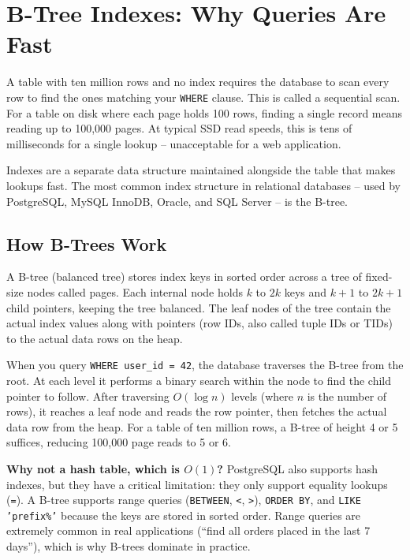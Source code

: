 \documentclass[11pt,a4paper]{article}
\begin{document}
\newpage

\section{B-Tree Indexes: Why Queries Are Fast}

A table with ten million rows and no index requires the database to scan every row to find the ones matching your \texttt{WHERE} clause. This is called a sequential scan. For a table on disk where each page holds 100 rows, finding a single record means reading up to 100,000 pages. At typical SSD read speeds, this is tens of milliseconds for a single lookup -- unacceptable for a web application.

Indexes are a separate data structure maintained alongside the table that makes lookups fast. The most common index structure in relational databases -- used by PostgreSQL, MySQL InnoDB, Oracle, and SQL Server -- is the B-tree.

\subsection{How B-Trees Work}

A B-tree (balanced tree) stores index keys in sorted order across a tree of fixed-size nodes called pages. Each internal node holds $k$ to $2k$ keys and $k+1$ to $2k+1$ child pointers, keeping the tree balanced. The leaf nodes of the tree contain the actual index values along with pointers (row IDs, also called tuple IDs or TIDs) to the actual data rows on the heap.

When you query \texttt{WHERE user\_id = 42}, the database traverses the B-tree from the root. At each level it performs a binary search within the node to find the child pointer to follow. After traversing $O(\log n)$ levels (where $n$ is the number of rows), it reaches a leaf node and reads the row pointer, then fetches the actual data row from the heap. For a table of ten million rows, a B-tree of height 4 or 5 suffices, reducing 100,000 page reads to 5 or 6.

\begin{thinkbox}
\textbf{Why not a hash table, which is $O(1)$?} PostgreSQL also supports hash indexes, but they have a critical limitation: they only support equality lookups (\texttt{=}). A B-tree supports range queries (\texttt{BETWEEN}, \texttt{<}, \texttt{>}), \texttt{ORDER BY}, and \texttt{LIKE 'prefix\%'} because the keys are stored in sorted order. Range queries are extremely common in real applications (``find all orders placed in the last 7 days''), which is why B-trees dominate in practice.
\end{thinkbox}
\end{document}
